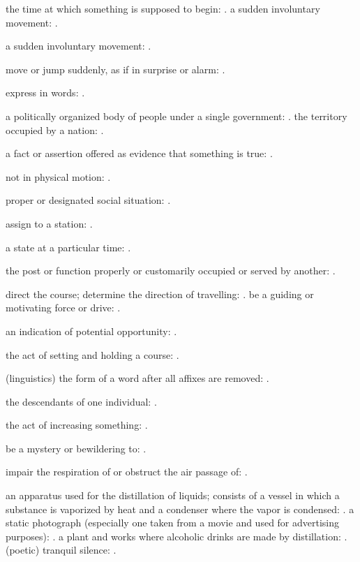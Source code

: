   the time at which something is supposed to begin: . a sudden involuntary movement: .

  a sudden involuntary movement: .

  move or jump suddenly, as if in surprise or alarm: .

  express in words: .

  a politically organized body of people under a single government: . the territory occupied by a nation: .

  a fact or assertion offered as evidence that something is true: .

  not in physical motion: .

  proper or designated social situation: .

  assign to a station: .

  a state at a particular time: .

  the post or function properly or customarily occupied or served by another: .

  direct the course; determine the direction of travelling: . be a guiding or motivating force or drive: .

  an indication of potential opportunity: .

  the act of setting and holding a course: .

  (linguistics) the form of a word after all affixes are removed: .

  the descendants of one individual: .

  the act of increasing something: .

  be a mystery or bewildering to: .

  impair the respiration of or obstruct the air passage of: .

  an apparatus used for the distillation of liquids; consists of a vessel in which a substance is vaporized by heat and a condenser where the vapor is condensed: . a static photograph (especially one taken from a movie and used for advertising purposes): . a plant and works where alcoholic drinks are made by distillation: . (poetic) tranquil silence: .

